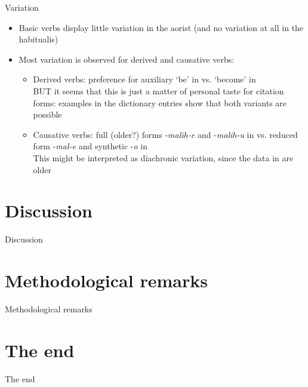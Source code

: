 \begin{frame}{Variation}
\begin{itemize}
    \item Basic verbs display little variation in the aorist (and no variation at all in the habitualis)
    \item Most variation is observed for derived and causative verbs:
    \begin{itemize}
        \item Derived verbs: preference for auxiliary `be' in \citep{saidovaabusov2012} vs. `become' in \citep{alekseev2019} \\ BUT it seems that this is just a matter of personal taste for citation forms: examples in the dictionary entries show that both variants are possible
        \item Causative verbs: full (older?) forms -\textit{malih-e} and -\textit{malih-u} in \citep{alekseev2019} vs. reduced form -\textit{mal-e} and synthetic -\textit{o} in \citep{saidovaabusov2012} \\ This might be interpreted as diachronic variation, since the data in \citep{alekseev2019} are older
    \end{itemize}
\end{itemize}
\end{frame}

\section{Discussion}
\begin{frame}{Discussion}
    
\end{frame}

\section{Methodological remarks}
\begin{frame}{Methodological remarks}
    
\end{frame}

\section{The end}
\begin{frame}{The end}
\begin{figure}[h]
\centering
{}
\end{figure}
\end{frame}

